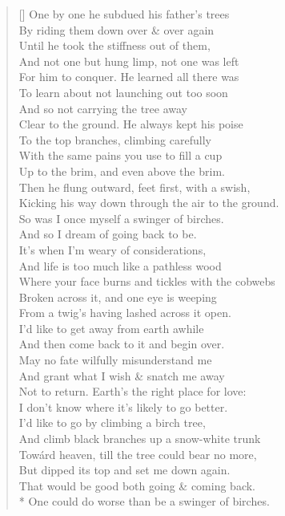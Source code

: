 \documentclass[MAIN]{subfiles}
\begin{document}
\begin{verse}[\versewidth]
One by one he subdued his father's trees\\
By riding them down over \& over again\\
Until he took the stiffness out of them,\\
And not one but hung limp, not one was left\\
For him to conquer. He learned all there was\\
To learn about not launching out too soon\\
And so not carrying the tree away\\
Clear to the ground. He always kept his poise\\
To the top branches, climbing carefully\\
With the same pains you use to fill a cup\\
Up to the brim, and even above the brim.\\
Then he flung outward, feet first, with a swish,\\
Kicking his way down through the air to the ground.\\
So was I once myself a swinger of birches.\\
And so I dream of going back to be.\\
It's when I'm weary of considerations,\\
And life is too much like a pathless wood\\
Where your face burns and tickles with the cobwebs\\
Broken across it, and one eye is weeping\\
From a twig's having lashed across it open.\\
I'd like to get away from earth awhile\\
And then come back to it and begin over.\\
May no fate wilfully misunderstand me\\
And  grant what I wish \& snatch me away\\
Not to return. Earth's the right place for love:\\
I don't know where it's likely to go better.\\
I'd like to go by climbing a birch tree,\\
And climb black branches up a snow-white trunk\\
Tow\'ard heaven, till the tree could bear no more,\\
But dipped its top and set me down again.\\
That would be good both going \& coming back.\\*
One could do worse than be a swinger of birches.
\end{verse}
\end{document}
